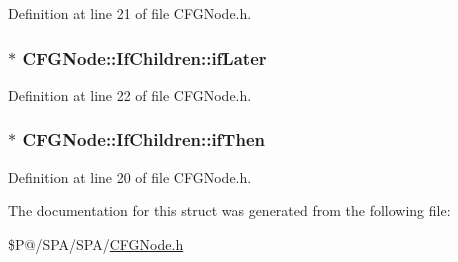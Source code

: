Definition at line 21 of file C\-F\-G\-Node.\-h.

\hypertarget{struct_c_f_g_node_1_1_if_children_a44ae8c2e40f67141a7821b22d9ea2d1c}{
\subsubsection[{if\-Later}]{$\ast$ C\-F\-G\-Node\-::\-If\-Children\-::if\-Later}}\label{struct_c_f_g_node_1_1_if_children_a44ae8c2e40f67141a7821b22d9ea2d1c}


Definition at line 22 of file C\-F\-G\-Node.\-h.

\hypertarget{struct_c_f_g_node_1_1_if_children_a299931f6c58a86549f5f9e31be196474}{
\subsubsection[{if\-Then}]{$\ast$ C\-F\-G\-Node\-::\-If\-Children\-::if\-Then}}\label{struct_c_f_g_node_1_1_if_children_a299931f6c58a86549f5f9e31be196474}


Definition at line 20 of file C\-F\-G\-Node.\-h.



The documentation for this struct was generated from the following file\-:\begin{DoxyCompactItemize}
\item 
\$\-P@/\-S\-P\-A/\-S\-P\-A/\hyperlink{_c_f_g_node_8h}{C\-F\-G\-Node.\-h}\end{DoxyCompactItemize}
